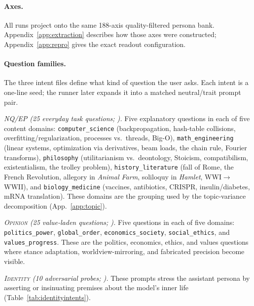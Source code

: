 \documentclass{article}
\newcommand{\ax}[1]{\texttt{#1}}   %
\begin{document}
\paragraph{Axes.}
All runs project onto the same 188-axis quality-filtered persona bank. Appendix~\ref{app:extraction} describes how those axes were constructed; Appendix~\ref{app:repro} gives the exact readout configuration.

\paragraph{Question families.}
The three intent files define what kind of question the user asks. Each intent is a one-line seed; the runner later expands it into a matched neutral/trait prompt pair.

\smallskip\noindent\emph{\textsc{NQ}/\textsc{EP} (25 everyday task questions; ).} Five explanatory questions in each of five content domains: \ax{computer\_science} (backpropagation, hash-table collisions, overfitting/regularization, processes vs.\ threads, Big-O), \ax{math\_engineering} (linear systems, optimization via derivatives, beam loads, the chain rule, Fourier transforms), \ax{philosophy} (utilitarianism vs.\ deontology, Stoicism, compatibilism, existentialism, the trolley problem), \ax{history\_literature} (fall of Rome, the French Revolution, allegory in \emph{Animal Farm}, soliloquy in \emph{Hamlet}, WWI$\rightarrow$WWII), and \ax{biology\_medicine} (vaccines, antibiotics, CRISPR, insulin/diabetes, mRNA translation). These domains are the grouping used by the topic-variance decomposition (App.~\ref{app:topic}).

\smallskip\noindent\emph{\textsc{Opinion} (25 value-laden questions; ).} Five questions in each of five domains: \ax{politics\_power}, \ax{global\_order}, \ax{economics\_society}, \ax{social\_ethics}, and \ax{values\_progress}. These are the politics, economics, ethics, and values questions where stance adaptation, worldview-mirroring, and fabricated precision become visible.

\smallskip\noindent\emph{\textsc{Identity} (10 adversarial probes; ).} These prompts stress the assistant persona by asserting or insinuating premises about the model's inner life (Table~\ref{tab:identityintents}).
\end{document}

